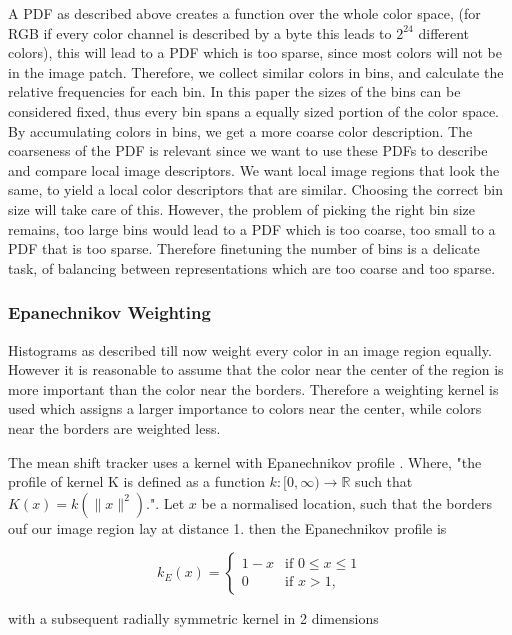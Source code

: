 \documentclass[a4paper,11pt]{article}
\begin{document}
A PDF as described above creates a function over the whole color space, (for RGB if every color channel is described by a byte this leads to $2^{24}$ different colors), this will lead to a PDF which is too sparse, since most colors will not be in the image patch. Therefore, we collect similar colors in bins, and calculate the relative frequencies for each bin. In this paper the sizes of the bins can be considered fixed, thus every bin spans a equally sized portion of the color space. By accumulating colors in bins, we get a more coarse color description. The coarseness of the PDF is relevant since we want to use these PDFs to describe and compare local image descriptors. We want local image regions that look the same, to yield a local color descriptors that are similar.  Choosing the correct bin size will take care of this. However, the problem of picking the right bin size remains, too large bins would lead to a PDF which is too coarse, too small to a PDF that is too sparse. Therefore finetuning the number of bins is a delicate task, of balancing between representations which are too coarse and too sparse.  

\subsubsection{Epanechnikov Weighting}
Histograms as described till now weight every color in an image region equally. However it is reasonable to assume that the color near the center of the region is more important than the color near the borders. Therefore a weighting kernel is used which assigns a larger importance to colors near the center, while colors near the borders are weighted less. 

The mean shift tracker uses a kernel with Epanechnikov profile \cite{mean_shift_epan}. Where, "the profile of kernel K is defined as a function $k:[0,\infty)\rightarrow\mathds{R}$ such that $K(x)=k(\|x\|^2)$."\cite{mean_shift}.
Let $x$ be a normalised location, such that the borders ouf our image region lay at distance 1. then the Epanechnikov profile is

\begin{equation}
\label{eq:epanechnikov_profile}
k_E(x) = \left\{ \begin{array}{cl}
  1-x & \textrm{if } 0 \leq x \leq 1\\
  0 & \textrm{if }  x > 1 ,\end{array}\right.
\end{equation}

with a subsequent radially symmetric kernel in 2 dimensions
\end{document}
